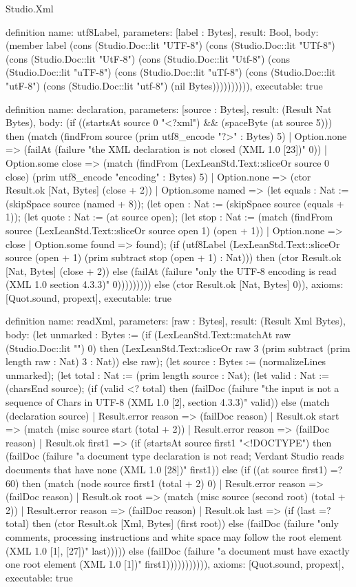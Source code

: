 \begin{lexlean}{Studio.Xml}
\begin{semanticmodule}
definition{
  name: utf8Label,
  parameters: [label : Bytes],
  result: Bool,
  body: (member label (cons (Studio.Doc::lit "UTF-8") (cons (Studio.Doc::lit "UTf-8") (cons (Studio.Doc::lit "UtF-8") (cons (Studio.Doc::lit "Utf-8") (cons (Studio.Doc::lit "uTF-8") (cons (Studio.Doc::lit "uTf-8") (cons (Studio.Doc::lit "utF-8") (cons (Studio.Doc::lit "utf-8") (nil Bytes)))))))))),
  executable: true
}

definition{
  name: declaration,
  parameters: [source : Bytes],
  result: (Result Nat Bytes),
  body: (if ((startsAt source 0 "<?xml") && (spaceByte (at source 5))) then (match (findFrom source (prim utf8_encode "?>" : Bytes) 5)
    | Option.none => (failAt (failure "the XML declaration is not closed (XML 1.0 [23])" 0))
    | Option.some close => (match (findFrom (LexLeanStd.Text::sliceOr source 0 close) (prim utf8_encode "encoding" : Bytes) 5)
      | Option.none => (ctor Result.ok [Nat, Bytes] (close + 2))
      | Option.some named => (let equals : Nat := (skipSpace source (named + 8)); (let open : Nat := (skipSpace source (equals + 1)); (let quote : Nat := (at source open); (let stop : Nat := (match (findFrom source (LexLeanStd.Text::sliceOr source open 1) (open + 1))
        | Option.none => close
        | Option.some found => found); (if (utf8Label (LexLeanStd.Text::sliceOr source (open + 1) (prim subtract stop (open + 1) : Nat))) then (ctor Result.ok [Nat, Bytes] (close + 2)) else (failAt (failure "only the UTF-8 encoding is read (XML 1.0 section 4.3.3)" 0))))))))) else (ctor Result.ok [Nat, Bytes] 0)),
  axioms: [Quot.sound, propext],
  executable: true
}

definition{
  name: readXml,
  parameters: [raw : Bytes],
  result: (Result Xml Bytes),
  body: (let unmarked : Bytes := (if (LexLeanStd.Text::matchAt raw (Studio.Doc::lit "\ufeff") 0) then (LexLeanStd.Text::sliceOr raw 3 (prim subtract (prim length raw : Nat) 3 : Nat)) else raw); (let source : Bytes := (normalizeLines unmarked); (let total : Nat := (prim length source : Nat); (let valid : Nat := (charsEnd source); (if (valid <? total) then (failDoc (failure "the input is not a sequence of Chars in UTF-8 (XML 1.0 [2], section 4.3.3)" valid)) else (match (declaration source)
    | Result.error reason => (failDoc reason)
    | Result.ok start => (match (misc source start (total + 2))
      | Result.error reason => (failDoc reason)
      | Result.ok first1 => (if (startsAt source first1 "<!DOCTYPE") then (failDoc (failure "a document type declaration is not read; Verdant Studio reads documents that have none (XML 1.0 [28])" first1)) else (if ((at source first1) =? 60) then (match (node source first1 (total + 2) 0)
        | Result.error reason => (failDoc reason)
        | Result.ok root => (match (misc source (second root) (total + 2))
          | Result.error reason => (failDoc reason)
          | Result.ok last => (if (last =? total) then (ctor Result.ok [Xml, Bytes] (first root)) else (failDoc (failure "only comments, processing instructions and white space may follow the root element (XML 1.0 [1], [27])" last))))) else (failDoc (failure "a document must have exactly one root element (XML 1.0 [1])" first1))))))))))),
  axioms: [Quot.sound, propext],
  executable: true
}


\end{semanticmodule}
\end{lexlean}
